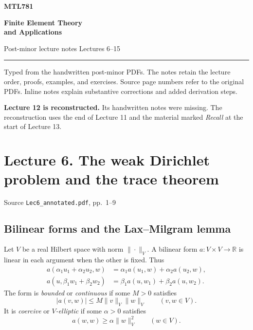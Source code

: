 \documentclass[11pt,a4paper]{article}
\newcommand{\lecturesource}[1]{%
  \par{\small\sffamily\color{Muted}#1}\par\vspace{0.15em}}
\newcommand{\editorialnote}[1]{%
  \par\noindent\colorbox{Tint}{\parbox{\dimexpr\linewidth-2\fboxsep\relax}{#1}}\par}
\begin{document}
\thispagestyle{fancy}
\vspace*{0.65em}
{\sffamily\bfseries\color{Muted} MTL781\par}
{\sffamily\bfseries\huge\color{Heading} Finite Element Theory\\[0.14em] and Applications\par}
\vspace{0.45em}
{\sffamily\large\color{Muted} Post-minor lecture notes \quad\textbullet\quad Lectures 6--15\par}
\vspace{0.9em}
{\color{Rule}\rule{\textwidth}{0.75pt}}\par
\vspace{0.45em}
Typed from the handwritten post-minor PDFs. The notes retain the lecture order,
proofs, examples, and exercises. Source page numbers refer to the original PDFs.
Inline notes explain substantive corrections and added derivation steps.

\editorialnote{\textbf{Lecture 12 is reconstructed.} Its handwritten notes were
missing. The reconstruction uses the end of Lecture 11 and the material
marked \emph{Recall} at the start of Lecture 13.}

\vspace{1.15em}
\tableofcontents

\clearpage
\section{Lecture 6. The weak Dirichlet problem and the trace theorem}
\lecturesource{Source \enspace\texttt{Lec6\_annotated.pdf}, pp.~1--9}

\subsection{Bilinear forms and the Lax--Milgram lemma}

Let \(V\) be a real Hilbert space with norm \(\|\cdot\|_V\). A
bilinear form \(a\colon V\times V\to\mathbb R\) is linear in each
argument when the other is fixed. Thus
\begin{align*}
a(\alpha_1u_1+\alpha_2u_2,w)
  &=\alpha_1a(u_1,w)+\alpha_2a(u_2,w),\\
a(u,\beta_1w_1+\beta_2w_2)
  &=\beta_1a(u,w_1)+\beta_2a(u,w_2).
\end{align*}
The form is \emph{bounded} or \emph{continuous} if some \(M>0\)
satisfies
\[
  |a(v,w)|\le M\|v\|_V\|w\|_V
  \qquad (v,w\in V).
\]
It is \emph{coercive} or \emph{\(V\)-elliptic} if some
\(\alpha>0\) satisfies
\[
  a(w,w)\ge\alpha\|w\|_V^2
  \qquad (w\in V).
\]
\end{document}
